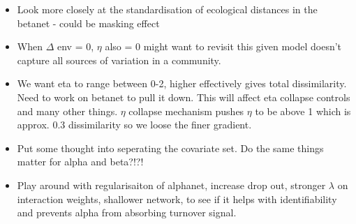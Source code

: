 \documentclass{article}
\begin{document}
\begin{itemize}
    \item Look more closely at the standardisation of ecological distances in the betanet - could be masking effect
    \item When $\Delta$ env = 0, $\eta$ also = 0  might want to revisit this given model doesn't capture all sources of variation in a community. 
    \item We want eta to range between 0-2, higher effectively gives total dissimilarity. Need to work on betanet to pull it down. This will affect eta collapse controls and many other things. $\eta$ collapse mechanism pushes $\eta$ to be above 1 which is approx. 0.3 dissimilarity so we loose the finer gradient. 
    \item Put some thought into seperating the covariate set. Do the same things matter for alpha and beta?!?!
    \item Play around with regularisaiton of alphanet, increase drop out, stronger $\lambda$ on interaction weights, shallower network, to see if it helps with identifiability and prevents alpha from absorbing turnover signal.
\end{itemize}
\end{document}
